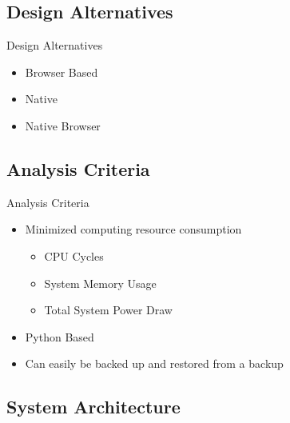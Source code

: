 \documentclass[17pt, aspectratio=169]{beamer}
\begin{document}
\subsection{Design Alternatives}
\begin{frame}{Design Alternatives}
	\begin{itemize}
		\item Browser Based
		\item Native
		\item Native Browser
	\end{itemize}
\end{frame}
\subsection{Analysis Criteria}
\begin{frame}{Analysis Criteria}
	\begin{itemize}
		\item Minimized computing resource consumption
		      \begin{itemize}
			      \item CPU Cycles
			      \item System Memory Usage
			      \item Total System Power Draw
		      \end{itemize}
		\item Python Based
		\item Can easily be backed up and restored from a backup
	\end{itemize}
\end{frame}
\subsection{System Architecture}
\end{document}
